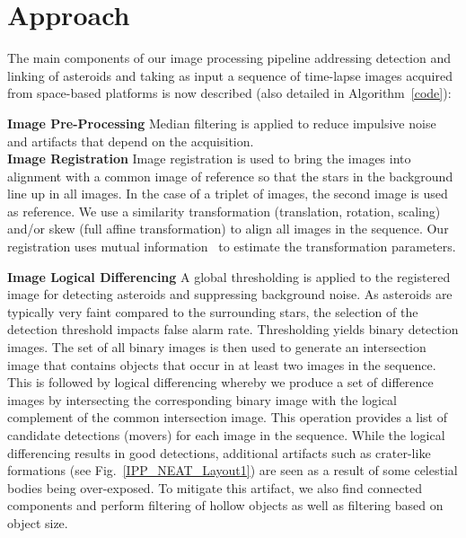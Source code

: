 \documentclass{article}
\begin{document}

\section{Approach}
\label{sec:approach}

The main components of our image processing pipeline addressing detection and linking of asteroids and taking as input a sequence of time-lapse images acquired from space-based platforms is now described  (also detailed in 
 Algorithm~\ref{code}):

\noindent
{\bf Image Pre-Processing} Median filtering is applied  to reduce impulsive noise and artifacts that depend on the acquisition.\\
{\bf Image Registration}
Image registration is used to bring the images into alignment with a common image of reference so that the stars in the background line up in all images.  In the case of a triplet of images, the second image is used as reference.  We use a similarity transformation (translation, rotation, scaling) and/or skew (full affine transformation) to align all images in the sequence.  Our registration uses mutual information~\cite{viola1997alignment} to estimate the transformation parameters.

{\bf Image Logical Differencing}
A global thresholding is applied to the registered image for detecting asteroids and suppressing background noise.  As asteroids are typically very faint compared to the surrounding stars, the selection of the detection threshold impacts false alarm rate.  Thresholding yields binary detection images.  The set of all binary images is then used to generate an intersection image that contains objects that occur in at least two images in the sequence.  This is followed by logical differencing whereby we produce a set of difference images by intersecting the corresponding binary image with the logical complement of the common intersection image.  This operation provides a list of candidate detections (movers) for each image in the sequence.  While the logical differencing results in good detections, additional artifacts such as crater-like formations (see Fig.~\ref{IPP_NEAT_Layout1}) are seen as a result of some celestial bodies being over-exposed.  To mitigate this artifact, we also find connected components and perform filtering of hollow objects as well as filtering based on object size.
\end{document}
